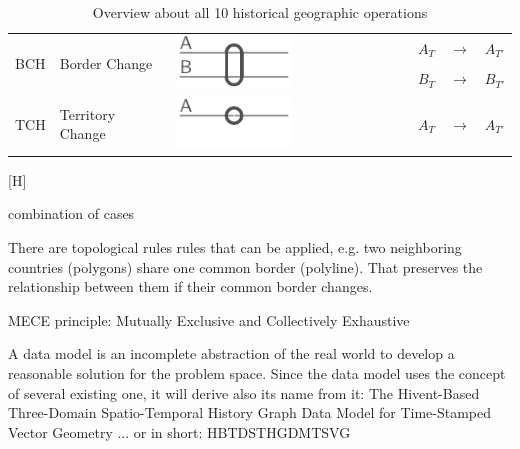 \begin{table}[H]
\begin{center}
\begin{tabular}{m{0.65cm} m{2.5cm} m{2.2cm}
                m{0.35cm} m{0.3cm} m{0.35cm} m{0.01cm}
                m{0.35cm} m{0.3cm} m{0.35cm} m{0.01cm}
                m{0.35cm} m{0.3cm} m{0.88cm}}
  \midrule
  \multirow{2}{*}{BCH} &
  \multirow{2}{*}{Border Change} &
  \multirow{2}{*}{\includegraphics{graphics/concept/operations/BCH}} &
  & & & &
  & & & &
  $ A_T $ & $ \rightarrow $ & $ A_{T'} $ \\
  & & &
  & & & &
  & & & &
  $ B_T $ & $ \rightarrow $ & $ B_{T'} $ \footnotemark \\

  \midrule
  \multirow{1}{*}{TCH} &
  \multirow{1}{*}{Territory Change} &
  \multirow{1}{*}{\includegraphics{graphics/concept/operations/NCH_TCH}} &
  & & & &
  & & & &
  $ A_T $ & $ \rightarrow $ & $ A_{T'} $ \\

  \bottomrule
\end{tabular}
\caption{Overview about all 10 historical geographic operations}
\label{tab:historical_geographic_operations}
\end{center}
\end{table}[H]

\addtocounter{footnote}{-4}
\addtocounter{footnote}{1}
\addtocounter{footnote}{1}
\addtocounter{footnote}{1}
\addtocounter{footnote}{1}



combination of cases

There are topological rules rules that can be applied, e.g. two neighboring countries (polygons) share one common border (polyline). That preserves the relationship between them if their common border changes.

MECE principle: Mutually Exclusive and Collectively Exhaustive


A data model is an incomplete abstraction of the real world to develop a reasonable solution for the problem space.
Since the data model uses the concept of several existing one, it will derive also its name from it: The Hivent-Based Three-Domain Spatio-Temporal History Graph Data Model for Time-Stamped Vector Geometry
... or in short: HBTDSTHGDMTSVG

